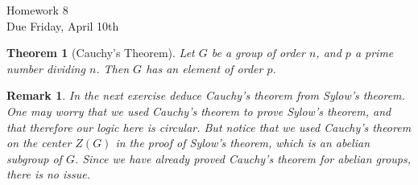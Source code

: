 \documentclass[11pt]{article}
\newtheorem{theorem}{Theorem}
\newtheorem*{remark}{Remark}
\begin{document}
\begin{center}
\Large {Homework 8}\\
\small {Due Friday, April 10th}
\end{center}
\begin{theorem}[Cauchy's Theorem]
  Let $G$ be a group of order $n$, and $p$ a prime number dividing $n$.  Then $G$ has an element of order $p$.
\end{theorem}
\begin{remark}
In the next exercise deduce Cauchy's theorem from Sylow's theorem. One may worry that we used Cauchy's theorem to prove Sylow's theorem, and that therefore our logic here is circular.  But notice that we used Cauchy's theorem on the center $Z(G)$ in the proof of Sylow's theorem, which is an abelian subgroup of $G$.  Since we have already proved Cauchy's theorem for abelian groups, there is no issue.
\end{remark}
\end{document}
